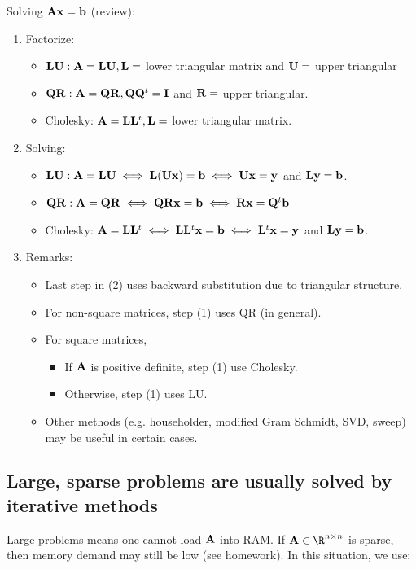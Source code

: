 \documentclass[./some_latex_template.tex]{subfiles}
\begin{document}
Solving $\mathbf{A} \mathbf{x} = \mathbf{b}$ (review):

\begin{enumerate}
	\item Factorize: 
		\begin{itemize}
			\item $\mathbf{L}\mathbf{U}: \mathbf{A} = \mathbf{L}\mathbf{U}, \mathbf{L} =$ lower triangular matrix and $\mathbf{U} =$ upper triangular
			\item $\mathbf{Q}\mathbf{R}: \mathbf{A} = \mathbf{Q}\mathbf{R}, \mathbf{Q}\mathbf{Q}^t = \mathbf{I}$ and $\mathbf{R} =$ upper triangular. 
			\item Cholesky: $\mathbf{A} = \mathbf{L}\mathbf{L}^t, \mathbf{L} =$ lower triangular matrix.
		\end{itemize}
	\item Solving:
		\begin{itemize}
			\item $\mathbf{L}\mathbf{U}: \mathbf{A} = \mathbf{L}\mathbf{U} \iff \mathbf{L}(\mathbf{U}\mathbf{x}) = \mathbf{b} \iff \mathbf{U}\mathbf{x} = \mathbf{y}$ and $\mathbf{L}\mathbf{y} = \mathbf{b}$.
			\item $\mathbf{Q}\mathbf{R}: \mathbf{A} = \mathbf{Q}\mathbf{R} \iff \mathbf{Q}\mathbf{R}\mathbf{x} = \mathbf{b} \iff \mathbf{R}\mathbf{x} = \mathbf{Q}^t\mathbf{b}$
			\item Cholesky: $\mathbf{A} = \mathbf{L}\mathbf{L}^t \iff \mathbf{L}\mathbf{L}^t\mathbf{x} = \mathbf{b} \iff \mathbf{L}^t\mathbf{x} = \mathbf{y}$ and $\mathbf{L}\mathbf{y} = \mathbf{b}$. 
		\end{itemize}
	\item Remarks:
		\begin{itemize}
			\item Last step in (2) uses backward substitution due to triangular structure. 
			\item For non-square matrices, step (1) uses QR (in general).
			\item For square matrices, 
				\begin{itemize}
					\item If $\mathbf{A}$ is positive definite, step (1) use Cholesky.
					\item Otherwise, step (1) uses LU. 
				\end{itemize}
			\item Other methods (e.g. householder, modified Gram Schmidt, SVD, sweep) may be useful in certain cases. 
		\end{itemize}
\end{enumerate}

\subsection{Large, sparse problems are usually solved by iterative methods}

Large problems means one cannot load $\mathbf{A}$ into RAM. If $\bA \in \R^{n \times n}$ is sparse, then memory demand may still be low (see homework). In this situation, we use:
\end{document}
